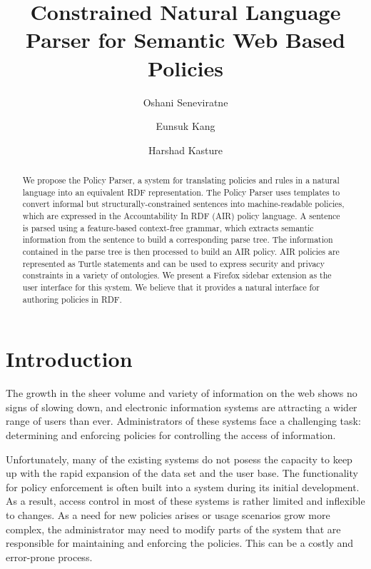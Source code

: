 \documentclass{llncs}
\begin{document}
\title{Constrained Natural Language Parser for Semantic Web Based Policies}

\author{Oshani Seneviratne \and Eunsuk Kang \and Harshad Kasture}


\maketitle
\begin{abstract}

We propose the Policy Parser, a system for translating
policies and rules in a natural language into an equivalent RDF
representation. The Policy Parser uses templates to convert informal
but structurally-constrained sentences into machine-readable
policies, which are expressed in the Accountability In RDF (AIR)
policy language. A sentence is parsed using a feature-based
context-free grammar, which extracts semantic information from the
sentence to build a corresponding parse tree. The information
contained in the parse tree is then processed to build an AIR
policy. AIR policies are represented as Turtle statements and can be
used to express security and privacy constraints in a variety of
ontologies. We present a Firefox sidebar extension as the user
interface for this system. We believe that it provides a natural
interface for authoring policies in RDF.

\end{abstract}


\section{Introduction}								
\label{sec:intro}

The growth in the sheer volume and variety of information on the web
shows no signs of slowing down, and electronic information systems are
attracting a wider range of users than ever. Administrators of these
systems face a challenging task: determining and enforcing policies
for controlling the access of information. 

Unfortunately, many of the existing systems do not posess the
capacity to keep up with the rapid expansion of the data set and the
user base. The functionality for policy enforcement is often built
into a system during its initial development. As a result, access
control in most of these systems is rather limited and inflexible to changes.
As a need for new policies arises or usage scenarios grow
more complex, the administrator may need to modify parts of the system
that are responsible for maintaining and enforcing the policies. This
can be a costly and error-prone process. 
\end{document}
